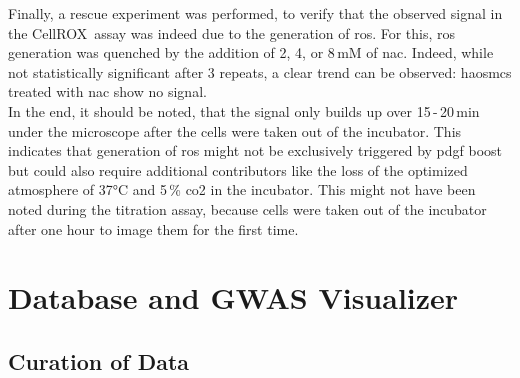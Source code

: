 Finally, a rescue experiment was performed, to verify that the observed signal in the CellROX\texttrademark~assay was indeed due to the generation of \ac{ros}. For this, \ac{ros} generation was quenched by the addition of 2, 4, or 8\,mM of \ac{nac}. Indeed, while not statistically significant after 3 repeats, a clear trend can be observed: \acp{haosmc} treated with \ac{nac} show no signal.\\
In the end, it should be noted, that the signal only builds up over 15\,-\,20\,min under the microscope after the cells were taken out of the incubator. This indicates that generation of \ac{ros} might not be exclusively triggered by \ac{pdgf} boost but could also require additional contributors like the loss of the optimized atmosphere of 37°C and 5\,\% \ac{co2} in the incubator. This might not have been noted during the titration assay, because cells were taken out of the incubator after one hour to image them for the first time.

\section{Database and GWAS Visualizer}

    \subsection{Curation of Data}

